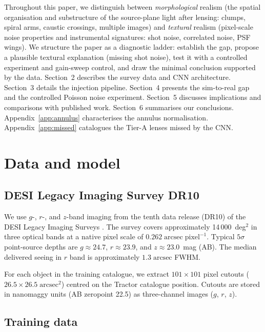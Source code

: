 \documentclass[fleqn,usenatbib]{rasti}
\begin{document}
Throughout this paper, we distinguish between \emph{morphological} realism (the spatial organisation and substructure of the source-plane light after lensing: clumps, spiral arms, caustic crossings, multiple images) and \emph{textural} realism (pixel-scale noise properties and instrumental signatures: shot noise, correlated noise, PSF wings).  We structure the paper as a diagnostic ladder: establish the gap, propose a plausible textural explanation (missing shot noise), test it with a controlled experiment and gain-sweep control, and draw the minimal conclusion supported by the data.  Section~2 describes the survey data and CNN architecture.  Section~3 details the injection pipeline.  Section~4 presents the sim-to-real gap and the controlled Poisson noise experiment.  Section~5 discusses implications and comparisons with published work.  Section~6 summarises our conclusions.  Appendix~\ref{app:annulus} characterises the annulus normalisation.  Appendix~\ref{app:missed} catalogues the Tier-A lenses missed by the CNN.


\section{Data and model}

\subsection{DESI Legacy Imaging Survey DR10}

We use $g$-, $r$-, and $z$-band imaging from the tenth data release (DR10) of the DESI Legacy Imaging Surveys \citep{Dey2019}.  The survey covers approximately 14\,000~deg$^{2}$ in three optical bands at a native pixel scale of $0.262\;\mathrm{arcsec\;pixel^{-1}}$.  Typical $5\sigma$ point-source depths are $g \approx 24.7$, $r \approx 23.9$, and $z \approx 23.0$~mag (AB).  The median delivered seeing in $r$ band is approximately $1.3\;\mathrm{arcsec}$ FWHM.

For each object in the training catalogue, we extract $101 \times 101$ pixel cutouts ($26.5 \times 26.5\;\mathrm{arcsec}^{2}$) centred on the Tractor catalogue position.  Cutouts are stored in nanomaggy units (AB zeropoint 22.5) as three-channel images ($g$, $r$, $z$).

\subsection{Training data}
\end{document}
